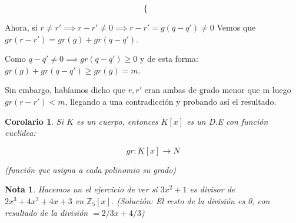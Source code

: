 \documentclass[11pt, a4paper, titlepage]{article}
\makeatletter
\renewenvironment{proof}[1][\proofname] {\vspace{-15pt}\par\pushQED{\qed}\normalfont\topsep6\p@\@plus6\p@\relax\trivlist\item[\hskip\labelsep\it#1\@addpunct{.}]\ignorespaces}{\popQED\endtrivlist\@endpefalse}
\providecommand{\ent}{\mathbb{Z}}
\theoremstyle{theorem-style}
\newtheorem{ncor}{Corolario}
\theoremstyle{definition-style}
\theoremstyle{remark-style}
\newtheorem*{nota}{Nota}
\theoremstyle{example-style}
\makeatother
\begin{document}
\begin{proof}
\begin{itemize}
\begin{itemize}
\[\begin{cases}
\end{cases}
	\quad
	\]
	
	Ahora, si $r\neq r'\implies r-r' \neq 0 \implies r-r' = g(q-q') \neq 0$
	Vemos que $gr(r-r') = gr(g)+ gr(q-q')$.
	
 Como $q-q' \neq 0 \implies gr(q-q') \geq 0 $ y de esta forma: $gr(g)+ gr(q-q') \geq gr(g) = m$.
 
 Sin embargo, habíamos dicho que $r,r'$ eran ambas de grado menor que m luego $gr(r-r') < m$, llegando a una contradicción y probando así el resultado.
\end{itemize} 
	
	
\end{itemize}
\end{proof}

\begin{ncor}
	Si $K$ es un cuerpo, entonces $K[x]$ es un D.E con función euclídea:
	
	\[
	gr: K[x] \to N
	\]
	
(función que asigna a cada polinomio su grado)
\end{ncor}

\begin{nota}
	Hacemos un el ejercicio de ver si $3x^2 +1$ es divisor de $2x^3 + 4x^2 +4x +3$ en $\ent _5[x]$. (Solución: El resto de la división es 0, con resultado de la división $= 2/3 x + 4/3$)
\end{nota}
\end{document}
